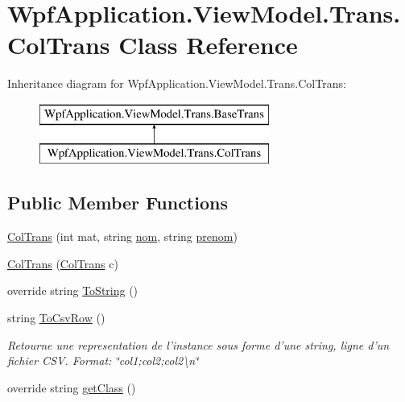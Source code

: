 \hypertarget{class_wpf_application_1_1_view_model_1_1_trans_1_1_col_trans}{\section{Wpf\-Application.\-View\-Model.\-Trans.\-Col\-Trans Class Reference}
\label{class_wpf_application_1_1_view_model_1_1_trans_1_1_col_trans}
}
Inheritance diagram for Wpf\-Application.\-View\-Model.\-Trans.\-Col\-Trans\-:\begin{figure}[H]
\begin{center}
\leavevmode
\includegraphics[height=2.000000cm]{class_wpf_application_1_1_view_model_1_1_trans_1_1_col_trans}
\end{center}
\end{figure}
\subsection*{Public Member Functions}
\begin{DoxyCompactItemize}
\item 
\hyperlink{class_wpf_application_1_1_view_model_1_1_trans_1_1_col_trans_a10806d4b09cb15edf1bdc68f650cc072}{Col\-Trans} (int mat, string \hyperlink{class_wpf_application_1_1_view_model_1_1_trans_1_1_col_trans_a4a0175ae91e92eff8ab56141df9d745d}{nom}, string \hyperlink{class_wpf_application_1_1_view_model_1_1_trans_1_1_col_trans_a3a74c60e37c799adda7bb94e1f8015b0}{prenom})
\item 
\hyperlink{class_wpf_application_1_1_view_model_1_1_trans_1_1_col_trans_af8b84e5512c2ac1764305e75a348be32}{Col\-Trans} (\hyperlink{class_wpf_application_1_1_view_model_1_1_trans_1_1_col_trans}{Col\-Trans} c)
\item 
override string \hyperlink{class_wpf_application_1_1_view_model_1_1_trans_1_1_col_trans_a07b2e23b8b3f221e6b5538d7666454e8}{To\-String} ()
\item 
string \hyperlink{class_wpf_application_1_1_view_model_1_1_trans_1_1_col_trans_a38ddd23b769263abad93935674851179}{To\-Csv\-Row} ()
\begin{DoxyCompactList}\small\item\em Retourne une representation de l'instance sous forme d'une string, ligne d'un fichier C\-S\-V. Format\-: \char`\"{}col1;col2;col2\textbackslash{}n\char`\"{} \end{DoxyCompactList}\item 
override string \hyperlink{class_wpf_application_1_1_view_model_1_1_trans_1_1_col_trans_aa3df7badaefa8f6adeb0de1147b649bc}{get\-Class} ()
\end{DoxyCompactItemize}
